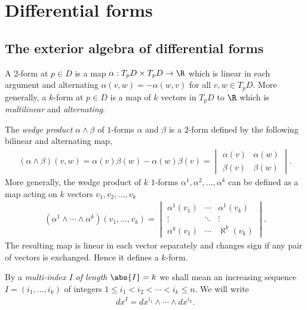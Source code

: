 \documentclass{article}
\begin{document}
\section{Differential forms}

\subsection{The exterior algebra of differential forms}

\begin{definition}
    A 2-form at $p\in D$ is a map $\alpha:T_pD\times T_p D \to \R$ which is linear in each argument
    and alternating $\alpha(v,w)=-\alpha(w,v)$ for all $v,w\in T_pD$. More generally, a $k$-form at
    $p\in D$ is a map of $k$ vectors in $T_pD$ to $\R$ which is \emph{multilinear} and \emph{alternating}.
\end{definition}

\begin{definition}
    The \emph{wedge product} $\alpha \wedge \beta$ of $1$-forms $\alpha$ and $\beta$ is a $2$-form defined
    by the following bilinear and alternating map,
    \begin{align*}
        (\alpha\wedge\beta)(v,w) = \alpha(v)\beta(w) - \alpha(w)\beta(v) = \begin{vmatrix}
            \alpha(v) &\alpha(w) \\
            \beta(v) &\beta(w)
        \end{vmatrix}.
    \end{align*}
    More generally, the wedge product of $k$ $1$-forms $\alpha^1,\alpha^2,...,\alpha^k$ can be defined as a
    map acting on $k$ vectors $v_1,v_2,...,v_k$
    \begin{align*}
        (\alpha^1\wedge\cdots\wedge\alpha^k)(v_1,...,v_k) = \begin{vmatrix}
            \alpha^1(v_1) &\cdots &\alpha^1(v_k)\\
            \vdots &\ddots &\vdots \\ 
            \alpha^k(v_1) &\cdots &\aleph^k(v_k)
        \end{vmatrix}.
    \end{align*}
    The resulting map is linear in each vector separately and changes sign if any pair of vectors is exchanged.
    Hence it defines a $k$-form.
\end{definition}

\begin{definition}
    By a \emph{multi-index $I$ of length $\abs{I}=k$} we shall mean an increasing sequence
    $I=(i_1,...,i_k)$ of integers $1\leq i_1<i_2<\cdots<i_k\leq n$. We will write
    \begin{align*}
        dx^I = dx^{i_1} \wedge \cdots \wedge dx^{i_k}.
    \end{align*}
\end{definition}
\end{document}
